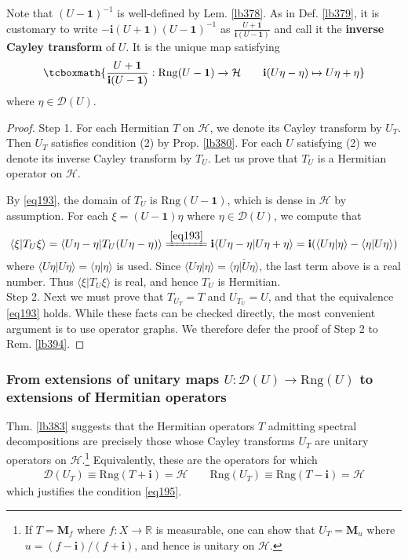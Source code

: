 \documentclass[12pt,b5paper,notitlepage]{article}
\theoremstyle{definition}
\theoremstyle{plain}
\newcommand{\ovl}{\overline}
\newcommand{\idt}{\mathbf{1}}
\newcommand{\Dom}{\mathscr{D}}
\newcommand{\bk}[1]{\langle {#1}\rangle}
\newcommand{\im}{\mathbf{i}}
\newcommand{\Rbb}{\mathbb R}
\newcommand{\Rng}{\mathrm{Rng}}
\newcommand{\MH}{\mathcal H}
\newcommand{\Mbf}{\mathbf M}
\numberwithin{equation}{section}
\begin{document}
Note that $(U-\idt)^{-1}$ is well-defined by Lem. \ref{lb378}. As in Def. \ref{lb379}, it is customary to write $-\im(U+\idt)(U-\idt)^{-1}$ as $\frac{U+\idt}{\im(U-\idt)}$ and call it the \textbf{inverse Cayley transform} of $U$.  It is the unique map satisfying
\begin{align}\label{eq193}
\tcboxmath{\frac{U+\idt}{\im(U-\idt)}:\Rng(U-\idt)\rightarrow\MH\qquad \im(U\eta-\eta)\mapsto U\eta+\eta}
\end{align}
where $\eta\in\Dom(U)$.



\begin{proof}
Step 1. For each Hermitian $T$ on $\MH$, we denote its Cayley transform by $U_T$. Then $U_T$ satisfies condition (2) by Prop. \ref{lb380}. For each $U$ satisfying (2) we denote its inverse Cayley transform by $T_U$. Let us prove that $T_U$ is a Hermitian operator on $\MH$.

By \eqref{eq193}, the domain of $T_U$ is $\Rng(U-\idt)$, which is dense in $\MH$ by assumption. For each $\xi=(U-\idt)\eta$ where $\eta\in\Dom(U)$, we compute that
\begin{align*}
\bk{\xi|T_U\xi}=\bk{U\eta-\eta|T_U(U\eta-\eta)}\xlongequal{\eqref{eq193}}\im\bk{U\eta-\eta|U\eta+\eta}=\im(\bk{U\eta|\eta}-\bk{\eta|U\eta})
\end{align*}
where $\bk{U\eta|U\eta}=\bk{\eta|\eta}$ is used. Since $\bk{U\eta|\eta}=\ovl{\bk{\eta|U\eta}}$, the last term above is a real number. Thus $\bk{\xi|T_U\xi}$ is real, and hence $T_U$ is Hermitian.\\[-1ex]

Step 2. Next we must prove that $T_{U_T}=T$ and $U_{T_U}=U$, and that the equivalence \eqref{eq193} holds. While these facts can be checked directly, the most convenient argument is to use operator graphs. We therefore defer the proof of Step 2 to Rem. \ref{lb394}.
\end{proof}


\subsubsection{From extensions of unitary maps $U:\Dom(U)\rightarrow\Rng(U)$ to extensions of Hermitian operators}\label{lb384}


Thm. \ref{lb383} suggests that the Hermitian operators $T$ admitting spectral decompositions are precisely those whose Cayley transforms $U_T$ are unitary operators on $\MH$.\footnote{If $T=\Mbf_f$ where $f:X\rightarrow\Rbb$ is measurable, one can show that $U_T=\Mbf_u$ where $u=(f-\im)/(f+\im)$, and hence is unitary on $\MH$.} Equivalently, these are the operators for which
\begin{align}\label{eq196}
\Dom(U_T)\equiv\Rng(T+\im)=\MH\qquad \Rng(U_T)\equiv\Rng(T-\im)=\MH
\end{align}
which justifies the condition \eqref{eq195}.
\end{document}
